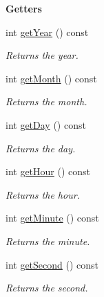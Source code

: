 \begin{Indent}{\bf Getters}\par
\begin{DoxyCompactItemize}
\item 
int \hyperlink{class_date_acbe0df036d53e8ddcfa96523177bbd23}{get\+Year} () const 
\begin{DoxyCompactList}\small\item\em Returns the year. \end{DoxyCompactList}\item 
int \hyperlink{class_date_a378143c24ab06d9dd38712fc515056dc}{get\+Month} () const 
\begin{DoxyCompactList}\small\item\em Returns the month. \end{DoxyCompactList}\item 
int \hyperlink{class_date_a9114656893af6950f86e9438c9d01c77}{get\+Day} () const 
\begin{DoxyCompactList}\small\item\em Returns the day. \end{DoxyCompactList}\item 
int \hyperlink{class_date_aa83005b132598f7af8fb70e5407e150c}{get\+Hour} () const 
\begin{DoxyCompactList}\small\item\em Returns the hour. \end{DoxyCompactList}\item 
int \hyperlink{class_date_a881f2c9fe6134e162277ecaa7a0f849b}{get\+Minute} () const 
\begin{DoxyCompactList}\small\item\em Returns the minute. \end{DoxyCompactList}\item 
int \hyperlink{class_date_ac05e321dbaeb598267d8163bc042f4c0}{get\+Second} () const 
\begin{DoxyCompactList}\small\item\em Returns the second. \end{DoxyCompactList}\end{DoxyCompactItemize}
\end{Indent}

